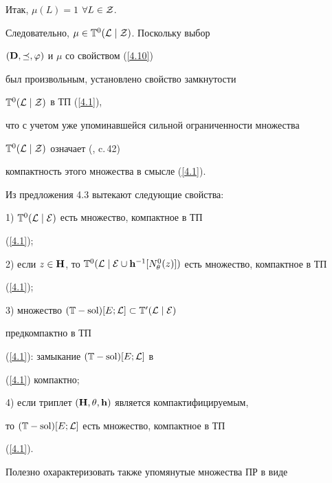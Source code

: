 {\begin{pf}
Итак, ${{\mu}(L)} = 1$ \; $\forall{L} \in {\cal Z}$.


Следовательно, $\mu \in {{\Bbb T}^0}({\cal L}\mid{\cal Z})$. Поскольку выбор


$({\bold D},\preceq,\varphi)$ и $\mu$ со свойством (\ref{4.10})


был произвольным, установлено свойство замкнутости


${{\Bbb T}^0}({\cal L}\mid{\cal Z})$ в ТП (\ref{4.1}),


что с учетом уже упоминавшейся сильной ограниченности множества


${{\Bbb T}^0}({\cal L}\mid{\cal Z})$ означает (\cite{6}, c.\,42)


компактность этого множества в смысле (\ref{4.1}).


\end{pf}





Из предложения 4.3 вытекают следующие свойства:





1) ${{\Bbb T}^0}({\cal L}\mid{\cal E})$ есть множество, компактное в ТП


(\ref{4.1});





2) если $z \in {\bold H}$, то ${{\Bbb T}^0}({\cal L}\mid{\cal


E}\cup{{\bold h}^{-1}}[{N_\theta^0}(z)])$ есть множество, компактное в ТП


(\ref{4.1});





3) множество $(\Bbb T-\operatorname{sol})[E;\cal L] \subset {{\Bbb T}^0}({\cal L}\mid{\cal E})$


предкомпактно в ТП


(\ref{4.1}): замыкание $({\Bbb T}-\operatorname{sol})[E;{\cal L}]$ в


(\ref{4.1}) компактно;





4) если триплет $({\bold H},\theta,{\bold h})$ является компактифицируемым,


то $({\Bbb T}-\operatorname{sol})[E;{\cal L}]$ есть множество, компактное в ТП


(\ref{4.1}).





Полезно охарактеризовать также упомянутые множества ПР в виде


}

